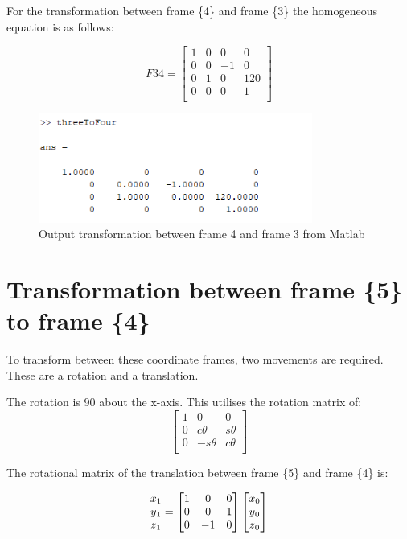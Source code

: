 \documentclass [11pt]{report}
\begin{document}
For the transformation between frame \{4\} and frame \{3\} the homogeneous equation is as follows: 

\begin{equation*}
F34
= 
\begin{bmatrix}
1&0&0&0\\
0&0&-1&0\\
0&1&0&120\\
0&0&0&1\\
\end{bmatrix}
\end{equation*}

\begin{figure}[H]
\centerline{\includegraphics[width=9cm]{threeToFouroutput.png}}
\caption{Output transformation between frame 4 and frame 3 from Matlab}
\label{fig}
\end{figure}

\section{Transformation between frame \{5\}\, to frame \{4\}}

To transform between these coordinate frames, two movements are required. These are a rotation and a translation. 

The rotation is 90{\degree} about the x-axis. This utilises the rotation matrix of: 
$$
\begin{bmatrix}
1&0&0\\
0&c{\theta}&s{\theta}\\
0&-s{\theta}&c{\theta}\\
\end{bmatrix}
$$

The rotational matrix of the translation between frame \{5\} and frame \{4\} is:

\begin{equation*}
\begin{matrix}
x\textsubscript{1}\\
y\textsubscript{1}\\
z\textsubscript{1}\\
\end{matrix}
= 
\begin{bmatrix}
1&0&0\\
0&0&1\\
0&-1&0\\
\end{bmatrix}
\begin{bmatrix}
x\textsubscript{0}\\
y\textsubscript{0}\\
z\textsubscript{0}\\
\end{bmatrix}
\end{equation*}
\end{document}
